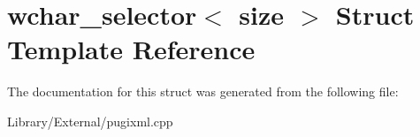 \hypertarget{structwchar__selector}{}\section{wchar\+\_\+selector$<$ size $>$ Struct Template Reference}
\label{structwchar__selector}


The documentation for this struct was generated from the following file\+:\begin{DoxyCompactItemize}
\item 
Library/\+External/pugixml.\+cpp\end{DoxyCompactItemize}
